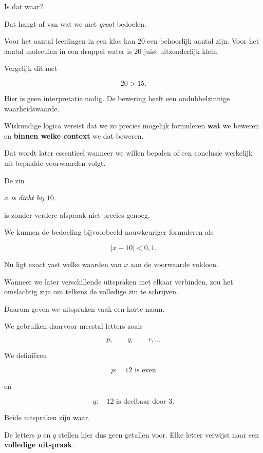 \documentclass{ximera}
\begin{document}
Is dat waar?

Dat hangt af van wat we met \emph{groot} bedoelen.

Voor het aantal leerlingen in een klas kan $20$ een behoorlijk aantal
zijn. Voor het aantal moleculen in een druppel water is $20$ juist
uitzonderlijk klein.

Vergelijk dit met

\[
20>15.
\]

Hier is geen interpretatie nodig. De bewering heeft een
ondubbelzinnige waarheidswaarde.


\begin{opmerking}
Wiskundige logica vereist dat we zo precies mogelijk formuleren
\textbf{wat} we beweren en \textbf{binnen welke context} we dat
beweren.

Dat wordt later essentieel wanneer we willen bepalen of een conclusie
werkelijk uit bepaalde voorwaarden volgt.
\end{opmerking}


\begin{voorbeeld}

De zin

\begin{center}
\textit{$x$ is dicht bij $10$.}
\end{center}

is zonder verdere afspraak niet precies genoeg.

We kunnen de bedoeling bijvoorbeeld nauwkeuriger formuleren als

\[
|x-10|<0{,}1.
\]

Nu ligt exact vast welke waarden van $x$ aan de voorwaarde voldoen.
\end{voorbeeld}



Wanneer we later verschillende uitspraken met elkaar verbinden,
zou het omslachtig zijn om telkens de volledige zin te schrijven.

Daarom geven we uitspraken vaak een korte naam.

We gebruiken daarvoor meestal letters zoals

\[
p,\qquad q,\qquad r,\ldots
\]


\begin{voorbeeld}

We definiëren

\[
p:\quad 12\text{ is even}
\]

en

\[
q:\quad 12\text{ is deelbaar door }3.
\]

Beide uitspraken zijn waar.

De letters $p$ en $q$ stellen hier dus geen getallen voor.
Elke letter verwijst naar een \textbf{volledige uitspraak}.
\end{voorbeeld}
\end{document}
